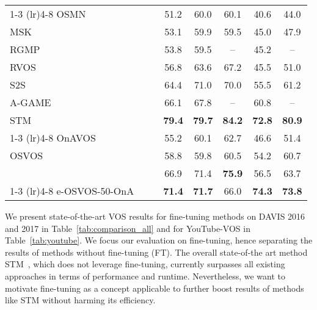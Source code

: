\documentclass{article}
\begin{document}
\begin{table*}
{\begin{tabular}[t]{lcc ccccc }
        \cmidrule(r){1-3} \cmidrule(lr){4-8}
OSMN~\cite{osmn}                  & & & 51.2 &60.0 &60.1 &40.6 &44.0 \\
        MSK~\cite{msk}                  & & & 53.1 & 59.9 & 59.5 & 45.0 & 47.9 \\
        RGMP~\cite{oh2018fast}                  & & & 53.8 & 59.5 & -- & 45.2 & -- \\
        RVOS~\cite{rvos}             & & & 56.8 & 63.6 & 67.2 & 45.5 & 51.0  \\
        S2S~\cite{s2s}                          & & & 64.4 & 71.0 & 70.0 & 55.5 & 61.2 \\
        A-GAME~\cite{agame}                & & & 66.1 & 67.8 & -- & 60.8 & -- \\
        STM~\cite{STM_19}                       & & & \textbf{79.4} & \textbf{79.7} & \textbf{84.2} & \textbf{72.8} & \textbf{80.9}  \\
\cmidrule(r){1-3} \cmidrule(lr){4-8}
OnAVOS~\cite{onavos}                                                & & & 55.2 & 60.1 & 62.7 & 46.6 & 51.4  \\
OSVOS~\cite{OSVOS}                                                & & & 58.8  & 59.8  & 60.5  & 54.2 & 60.7  \\
~\cite{luiten2018premvos}   & & & 66.9 & 71.4  & \textbf{75.9} & 56.5 & 63.7 \\

        \cmidrule(r){1-3} \cmidrule(lr){4-8}
e-OSVOS-50-OnA                     &  & & \textbf{71.4} & \textbf{71.7}  & 66.0 & \textbf{74.3} & \textbf{73.8} \\
        \bottomrule
    \end{tabular}
    }
\label{tab:youtube}
\end{table*} 
    We present state-of-the-art VOS results for fine-tuning methods on DAVIS 2016 and 2017 in Table~\ref{tab:comparison_all} and for YouTube-VOS in Table~\ref{tab:youtube}.
We focus our evaluation on fine-tuning, hence separating the results of methods without fine-tuning (FT).
The overall state-of-the art method STM~\cite{STM_19}, which does not leverage fine-tuning, currently surpasses all existing approaches in terms of performance and runtime.
Nevertheless, we want to motivate fine-tuning as a concept applicable to further boost results of methods like STM without harming its efficiency.
\end{document}
